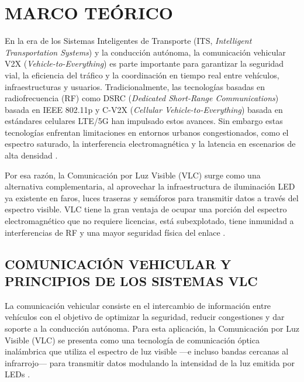 \section{MARCO TEÓRICO}
En la era de los Sistemas Inteligentes de Transporte (ITS, \textit{Intelligent Transportation Systems}) y la conducción autónoma, la comunicación vehicular V2X (\textit{Vehicle-to-Everything}) es parte importante para garantizar la seguridad vial, la eficiencia del tráfico y la coordinación en tiempo real entre vehículos, infraestructuras y usuarios. Tradicionalmente, las tecnologías basadas en radiofrecuencia (RF) como DSRC (\textit{Dedicated Short-Range Communications}) basada en IEEE 802.11p y C-V2X (\textit{Cellular Vehicle-to-Everything}) basada en estándares celulares LTE/5G han impulsado estos avances. Sin embargo estas tecnologías enfrentan limitaciones en entornos urbanos congestionados, como el espectro saturado, la interferencia electromagnética y la latencia en escenarios de alta densidad \cite{feukeu2023enhancing}.

Por esa razón, la Comunicación por Luz Visible (VLC) surge como una alternativa complementaria, al aprovechar la infraestructura de iluminación LED ya existente en faros, luces traseras y semáforos para transmitir datos a través del espectro visible. VLC tiene la gran ventaja de ocupar una porción del espectro electromagnético que no requiere licencias, está subexplotado, tiene inmunidad a interferencias de RF y una mayor seguridad física del enlace \cite{georlette2020visible}.


 

\subsection{COMUNICACIÓN VEHICULAR Y PRINCIPIOS DE LOS SISTEMAS VLC}
La comunicación vehicular consiste en el intercambio de información entre vehículos con el objetivo de optimizar la seguridad, reducir congestiones y dar soporte a la conducción autónoma. Para esta aplicación, la Comunicación por Luz Visible (VLC) se presenta como una tecnología de comunicación óptica inalámbrica que utiliza el espectro de luz visible ---e incluso bandas cercanas al infrarrojo---  para transmitir datos modulando la intensidad de la luz emitida por LEDs \cite{feukeu2023enhancing, georlette2020visible}.

